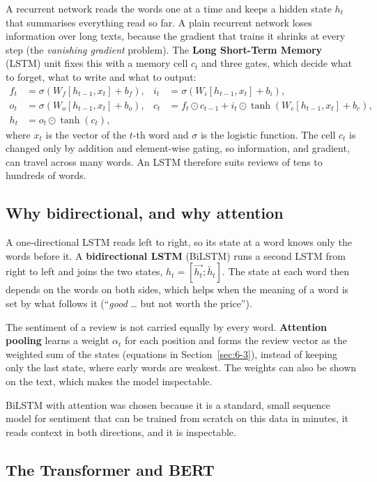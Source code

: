 A recurrent network reads the words one at a time and keeps a hidden state $h_t$ that summarises everything read so far. A plain recurrent network loses information over long texts, because the gradient that trains it shrinks at every step (the \emph{vanishing gradient} problem). The \textbf{Long Short-Term Memory} (LSTM) unit fixes this with a memory cell $c_t$ and three gates, which decide what to forget, what to write and what to output:
\begin{align*}
    f_t &= \sigma(W_f[h_{t-1},x_t]+b_f), & i_t &= \sigma(W_i[h_{t-1},x_t]+b_i),\\
    o_t &= \sigma(W_o[h_{t-1},x_t]+b_o), & c_t &= f_t\odot c_{t-1} + i_t\odot\tanh(W_c[h_{t-1},x_t]+b_c),\\
    h_t &= o_t\odot\tanh(c_t), & &
\end{align*}
where $x_t$ is the vector of the $t$-th word and $\sigma$ is the logistic function. The cell $c_t$ is changed only by addition and element-wise gating, so information, and gradient, can travel across many words. An LSTM therefore suits reviews of tens to hundreds of words.

\subsection*{Why bidirectional, and why attention}

A one-directional LSTM reads left to right, so its state at a word knows only the words before it. A \textbf{bidirectional LSTM} (BiLSTM) runs a second LSTM from right to left and joins the two states, $h_t=[\overrightarrow{h_t};\overleftarrow{h_t}]$. The state at each word then depends on the words on both sides, which helps when the meaning of a word is set by what follows it (``\emph{good} \ldots{} but not worth the price'').

The sentiment of a review is not carried equally by every word. \textbf{Attention pooling} learns a weight $\alpha_t$ for each position and forms the review vector as the weighted sum of the states (equations in Section~\ref{sec:6-3}), instead of keeping only the last state, where early words are weakest. The weights can also be shown on the text, which makes the model inspectable.

BiLSTM with attention was chosen because it is a standard, small sequence model for sentiment that can be trained from scratch on this data in minutes, it reads context in both directions, and it is inspectable.

\subsection*{The Transformer and BERT}

